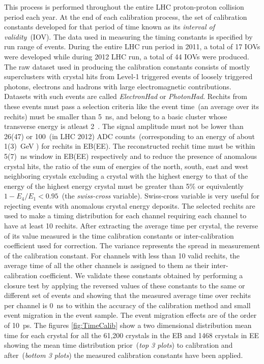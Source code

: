 This process is performed throughout the entire LHC proton-proton collision period each year. At the end of each calibration process, the set of calibration constants developed for that period of time known as its \textit{interval of validity}~(IOV). The data used in measuring the timing constants is specified by run range of events. During the entire LHC run period in 2011, a total of 17 IOVs were developed while during 2012 LHC run, a total of 44 IOVs were produced. The raw dataset used in producing the calibration constants consists of mostly superclusters with crystal hits from Level-1 triggered events of loosely triggered  photons, electrons and hadrons with large electromagnetic contributions. Datasets with such events are called \textit{ElectronHad} or \textit{PhotonHad}. Rechits from these events must pass a selection criteria like the event time~(an average over its rechits) must be smaller than 5~ns, and belong to a basic cluster whose transverse energy is atleast 2~\GeV. The signal amplitude must not be lower than 26(47) or 100~(in LHC 2012) ADC counts~(corresponding to an energy of about 1(3)~GeV ) for rechits in EB(EE). The reconstructed rechit time must be within 5(7)~ns window in EB(EE) respectively and to reduce the presence of anomalous crystal hits, the ratio of the sum of energies of the north, south, east and west neighboring crystals excluding a crystal with the highest energy to that of the energy of the highest energy crystal must be greater than 5\%  or equivalently $ 1 - E_{4}/E_{1} < 0.95$~(the \textit{swiss-cross} variable). Swiss-cross variable is very useful for rejecting events with anomalous crystal energy deposits. The selected rechits are used to make a timing distribution for each channel requiring  each channel to have at least 10 rechits. After extracting the average time per crystal, the reverse of its value measured is the time calibration constants or inter-calibration coefficient used for correction. The variance represents the spread in measurement of the calibration constant. For channels with less than 10 valid rechits, the average time of all the other channels is assigned to them as their inter-calibration coefficient. We validate these constants obtained by performing a closure test by applying the reversed values of these constants to the same or different set of events and showing that the measured average time over rechits per channel is 0~ns to within the accuracy of the calibration method and small event migration in the event sample. The event migration effects are of the order of 10~ps.
The figures \ref{fig:TimeCalib} show a two dimensional distribution mean time for each crystal for all the 61,200 crystals in the EB and 1468 crystals in EE showing the mean time distribution prior~(\textit{top 3 plots}) to calibration and after~(\textit{bottom 3 plots}) the measured calibration constants have been applied.
